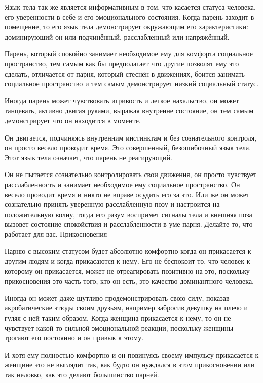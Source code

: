 Язык тела так же является информативным в том, что касается статуса человека, его уверенности в себе и его эмоционального состояния. Когда парень заходит в помещение, то его язык тела демонстрирует окружающим его характеристики: доминирующий он или подчинённый, расслабленный или напряжённый.

Парень, который спокойно занимает необходимое ему для комфорта социальное пространство, тем самым как бы предполагает что другие позволят ему это сделать, отличается от парня, который стеснён в движениях, боится занимать социальное пространство и тем самым демонстрирует низкий социальный статус.

Иногда парень может чувствовать игривость и легкое нахальство, он может танцевать, активно двигая руками, выражая внутренне состояние, он тем самым демонстрирует что он находится в моменте.

Он двигается, подчиняясь внутренним инстинктам и без сознательного контроля, он просто весело проводит время. Это совершенный, безошибочный язык тела. Этот язык тела означает, что парень не реагирующий.

Он не пытается сознательно контролировать свои движения, он просто чувствует расслабленность и занимает необходимое ему социальное пространство. Он весело проводит время и никто не вправе осудить его за это. Или же он может сознательно принять уверенную расслабленную позу и настроится на положительную волну, тогда его разум воспримет сигналы тела и внешняя поза вызовет состояние спокойствия и расслабленности в уме парня. Делайте то, что работает для вас.
Прикосновения

Парню с высоким статусом будет абсолютно комфортно когда он прикасается к другим людям и когда прикасаются к нему. Его не беспокоит то, что человек к которому он прикасается, может не отреагировать позитивно на это, поскольку прикосновения это часть того, кто он есть, это качество доминантного человека.

Иногда он может даже шутливо продемонстрировать свою силу, показав акробатические этюды своим друзьям, например забросив девушку на плечо и гуляя с ней таким образом. Когда женщина прикасается к нему, то он не чувствует какой-то сильной эмоциональной реакции, поскольку женщины трогают его постоянно и он привык к этому.

И хотя ему полностью комфортно и он повинуясь своему импульсу прикасается к женщине это не выглядит так, как будто он нуждался в этом прикосновении или так неловко, как это делают большинство парней.

